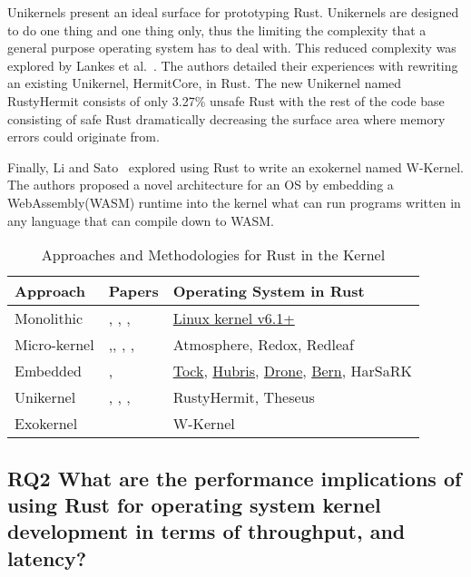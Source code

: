 \documentclass[sigconf,review,anonymous]{acmart}
\begin{document}
Unikernels present an ideal surface for prototyping Rust. Unikernels are designed to do one thing
and one thing only, thus the limiting the complexity that a general purpose operating system has to
deal with. This reduced complexity was explored by Lankes et al.~\cite{Lankes2019-cm}. The authors
detailed their experiences with rewriting an existing Unikernel, HermitCore, in Rust. The new
Unikernel named RustyHermit consists of only 3.27\% unsafe Rust with the rest
of the code base consisting of safe Rust dramatically decreasing the surface area where memory errors
could originate from.

Finally, Li and Sato~\cite{Li2024-yb} explored using Rust to write an exokernel named W-Kernel. The authors
proposed a novel architecture for an OS by embedding a WebAssembly(WASM) runtime into the kernel
what can run programs written in any language that can compile down to WASM.

\begin{table*}
    \begin{tabular}{||l|l|l||}
    \hline
    Approach & Papers & Operating System in Rust\\
    \hline\hline
    Monolithic  & \cite{The_kernel_development_community_undated-iw}, \cite{Li2019-ru}, \cite{Miller2021-pg}, \cite{Oikawa2023-ms} & \href{https://docs.kernel.org/rust/}{Linux kernel v6.1+}\\
    Micro-kernel & \cite{Chen2023-wb},\cite{Liang2021-bo}, \cite{Liu2024-xe}, \cite{Narayanan2020-gs}, \cite{Narayanan2019-fd} & Atmosphere, Redox, Redleaf\\
    Embedded & \cite{Culic2022-bk}, \cite{Vishnunaryan2022-yd} & \href{https://github.com/tock/tock}{Tock}, \href{https://hubris.oxide.computer/}{Hubris}, \href{https://www.drone-os.com/}{Drone}, \href{https://bern-rtos.org/}{Bern}, HarSaRK \\
    Unikernel & \cite{Lankes2019-cm},  \cite{Boos2020-zh}, \cite{Ijaz2023-da}, \cite{Sung2020-bb}  & RustyHermit, Theseus \\
    Exokernel & \cite{Li2024-yb} & W-Kernel \\
    \hline
  \end{tabular}
  \caption{Approaches and Methodologies for Rust in the Kernel}
    \label{tab:RQ1}
\end{table*}


\subsection{RQ2  What are the performance implications of using Rust for operating system
      kernel development in terms of throughput, and  latency?}
\end{document}
